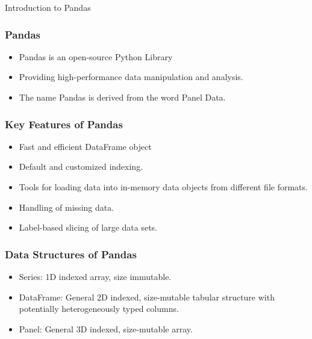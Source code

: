 \begin{frame}
  \begin{center}
    {\Large Introduction to Pandas}
	
  \end{center}
\end{frame}

\begin{frame}[fragile]\frametitle{Pandas}
\begin{itemize}
\item Pandas is an open-source Python Library 
\item Providing high-performance data manipulation and analysis. 
\item The name Pandas is derived from the word Panel Data.
\end{itemize}
\end{frame}

\begin{frame}[fragile]\frametitle{Key Features of Pandas}
\begin{itemize}
\item Fast and efficient DataFrame object 
\item Default and customized indexing.
\item Tools for loading data into in-memory data objects from different file formats.
\item Handling of missing data.
\item Label-based slicing of large data sets.
\end{itemize}
\end{frame}


\begin{frame}[fragile]\frametitle{Data Structures of Pandas}
\begin{itemize}
\item 
    Series: 1D indexed array, size immutable.
    \item 
    DataFrame: General 2D indexed, size-mutable tabular structure with potentially heterogeneously typed columns.
    \item 
    Panel: General 3D indexed, size-mutable array.

\end{itemize}
\end{frame}

